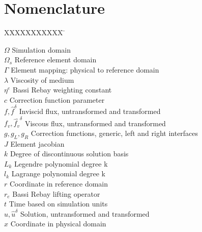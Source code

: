 
\section*{Nomenclature}

 \begin{tabbing}
  XXXXXXXXXXX \= \kill %

$\Omega$ \> Simulation domain \\
$\Omega_s$ \> Reference element domain \\
$\Gamma$ \> Element mapping: physical to reference domain \\
$\lambda$ \> Viscosity of medium \\
$\eta^e$ \> Bassi Rebay weighting constant \\

$c$ \> Correction function parameter \\
$f, \hat{f}^{\delta} $ \> Inviscid flux, untransformed and transformed \\

$f_v, \hat{f_v}^{\delta} $ \> Viscous flux, untransformed and transformed \\

$g, g_L, g_R$ \> Correction functions, generic, left and right interfaces \\

$J$ \> Element jacobian \\

$k$ \> Degree of discontinuous solution basis \\
$L_k$ \> Legendre polynomial degree k \\
$l_k$ \> Lagrange polynomial degree k \\

$r$ \> Coordinate in reference domain \\
$r_e$ \> Bassi Rebay lifting operator \\
$t$ \> Time based on simulation units \\
$u, \hat{u}^{\delta} $ \> Solution, untransformed and transformed \\
$x$ \> Coordinate in physical domain \\

 \end{tabbing}